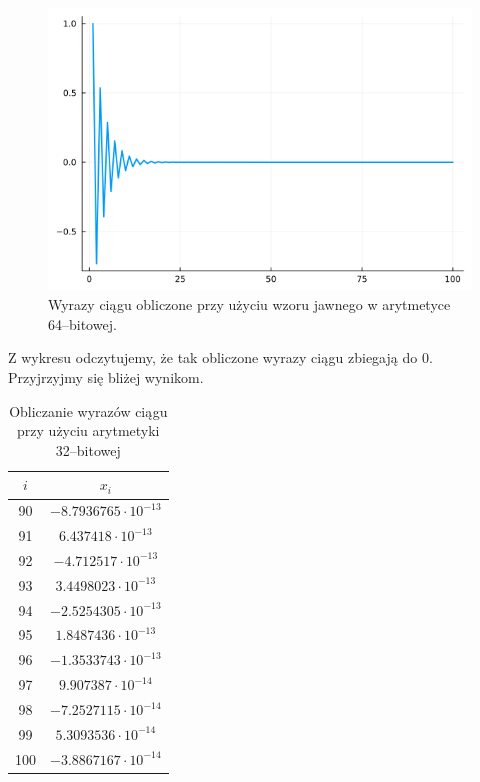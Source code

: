 \documentclass{article}
\begin{document}
\begin{figure}[!h]
    \centering
    \includegraphics[scale=0.4]{plot64_2.png}
    \caption{Wyrazy ciągu obliczone przy użyciu wzoru jawnego w arytmetyce 64--bitowej.}
    \label{fig:plot64_2}
\end{figure}

Z wykresu odczytujemy, że tak obliczone wyrazy ciągu zbiegają do 0. Przyjrzyjmy się bliżej wynikom. 


\newpage

\begin{table}[!h]
    \centering
     \begin{tabular}{|c|c|}
            \hline
             \(i\) & \(x_i\) \\
             \hline \hline
            90 &  \(-8.7936765 \cdot 10^{-13} \) \\
            91 &  \(6.437418 \cdot 10^{-13} \) \\
            92 &  \(-4.712517 \cdot 10^{-13} \) \\
            93 &  \(3.4498023 \cdot 10^{-13} \) \\
            94 &  \(-2.5254305 \cdot 10^{-13}\) \\
            95 &  \(1.8487436 \cdot 10^{-13} \) \\
            96 &  \(-1.3533743 \cdot 10^{-13} \) \\
            97 &  \(9.907387 \cdot 10^{-14}\) \\
            98 &  \(-7.2527115 \cdot 10^{-14} \) \\
            99 &  \(5.3093536 \cdot 10^{-14} \) \\
            100 &  \(-3.8867167 \cdot 10^{-14} \) \\
            \hline
    \end{tabular}
    \caption{Obliczanie wyrazów ciągu przy użyciu arytmetyki 32--bitowej}
    \label{tab:expl_32}
\end{table}
\end{document}
